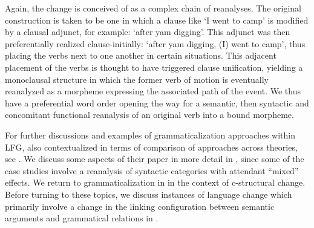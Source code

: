 \documentclass[output=paper,hidelinks]{langscibook}
\begin{document}
Again, the change is conceived of as a complex chain of  reanalyses.  The original construction is taken to be one in which a clause like `I went to camp' is modified by a clausal adjunct, for example: `after yam digging'.  This adjunct was then preferentially realized clause-initially:  `after yam digging, (I) went to camp', thus placing the verbs next to one another in certain situations.  This  adjacent placement of the verbs is thought to have triggered clause unification, yielding a monoclausal structure in which the former verb of motion is eventually reanalyzed as a morpheme expressing the associated path of the event. We thus have a preferential word order opening the way for  a semantic, then syntactic and concomitant functional reanalysis of an original verb into a bound morpheme. 

\hspace*{-.2pt}For further discussions and examples of grammaticalization approaches within LFG, also contextualized in terms of comparison of approaches across theories, see   \citet{vincent2020heads}.  We discuss some aspects of their paper in more detail in , since some of the case studies involve a reanalysis of syntactic categories with attendant ``mixed'' effects. We return to grammaticalization in  in the context of c-structural change. Before turning to these topics, we discuss instances of language change which primarily involve a change in the linking configuration between semantic arguments and grammatical relations in .


 
\end{document}
